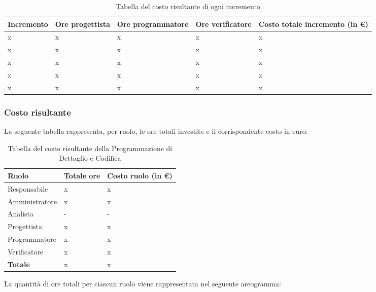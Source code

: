 {
\renewcommand{\arraystretch}{1.65}
\centering
\begin{longtable}{ C{2.1cm} C{2.7cm} C{3cm} C{3cm} C{3.3cm} }
\caption{Tabella del costo risultante di ogni incremento}\\
\rowcolor{\primaryColor}
\textcolor{\secondaryColor}{\textbf{Incremento}} & 
\textcolor{\secondaryColor}{\textbf{Ore progettista}} &
\textcolor{\secondaryColor}{\textbf{Ore programmatore}}&
\textcolor{\secondaryColor}{\textbf{Ore verificatore}}&
\textcolor{\secondaryColor}{\textbf{Costo totale incremento (in \euro{})}}\\
\endhead


x & x & x & x & x\\
x & x & x & x & x\\
x & x & x & x & x\\
x & x & x & x & x\\
x & x & x & x & x\\



\end{longtable}
}



\subsubsection{Costo risultante}
La seguente tabella rappresenta, per ruolo, le ore totali investite e il corrispondente costo in euro:
{
\renewcommand{\arraystretch}{2}
\begin{longtable}{ C{3cm} C{2cm} C{4cm}}
\caption{Tabella del costo risultante della Programmazione di Dettaglio e Codifica}\\
\rowcolor{\primaryColor}

\textcolor{\secondaryColor}{\textbf{Ruolo}} & 
\textcolor{\secondaryColor}{\textbf{Totale ore}} & 
\textcolor{\secondaryColor}{\textbf{Costo ruolo (in \euro{})}}\\	
\endhead
        
Responsabile    & x & x \\
Amministratore  & x & x \\
Analista        & - & - \\
Progettista     & x & x \\
Programmatore   & x & x \\
Verificatore    & x & x \\
\textbf{Totale} & x & x \\
		
\end{longtable}
}


\vskip 30pt %
La quantità di ore totali per ciascun ruolo viene rappresentata nel seguente areogramma:
\begin{center}
\end{center}
